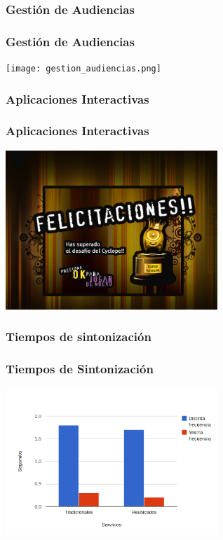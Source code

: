 \documentclass[a4paper,11pt]{beamer}
\begin{document}
		\subsubsection{Gestión de Audiencias}
		\begin{frame}
			\frametitle{Gestión de Audiencias}
			\begin{center}
					\texttt{[image: gestion\_audiencias.png]}
				\end{center}
		\end{frame}

		\subsubsection{Aplicaciones Interactivas}
		\begin{frame}
			\frametitle{Aplicaciones Interactivas}
			\begin{center}
					\includegraphics[width=8cm]{sokoban.jpg}
				\end{center}
		\end{frame}

		\subsubsection{Tiempos de sintonización}
		\begin{frame}
			\frametitle{Tiempos de Sintonización}
			\begin{center}
					\includegraphics[width=8cm]{tune_time.png}
				\end{center}
		\end{frame}
\end{document}
